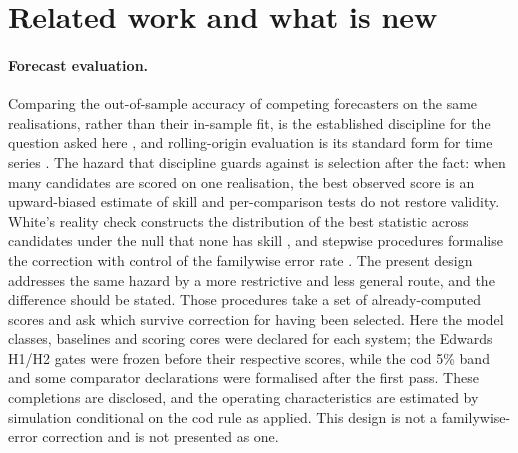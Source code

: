 \documentclass[preprint,11pt,authoryear]{elsarticle}
\theoremstyle{definition}
\theoremstyle{remark}
\begin{document}
\section{Related work and what is new}\label{sec:related}

\paragraph{Forecast evaluation.} Comparing the out-of-sample accuracy of competing forecasters on the same realisations, rather than their in-sample fit, is the established discipline for the question asked here \citep{Diebold1995,HyndmanKoehler2006,HyndmanAthanasopoulos2021}, and rolling-origin evaluation is its standard form for time series \citep{Tashman2000,Bergmeir2012}. The hazard that discipline guards against is selection after the fact: when many candidates are scored on one realisation, the best observed score is an upward-biased estimate of skill and per-comparison tests do not restore validity. White's reality check constructs the distribution of the best statistic across candidates under the null that none has skill \citep{White2000}, and stepwise procedures formalise the correction with control of the familywise error rate \citep{RomanoWolf2005}. The present design addresses the same hazard by a more restrictive and less general route, and the difference should be stated. Those procedures take a set of already-computed scores and ask which survive correction for having been selected. Here the model classes, baselines and scoring cores were declared for each system; the Edwards H1/H2 gates were frozen before their respective scores, while the cod 5\% band and some comparator declarations were formalised after the first pass. These completions are disclosed, and the operating characteristics are estimated by simulation conditional on the cod rule as applied. This design is not a familywise-error correction and is not presented as one.
\end{document}
